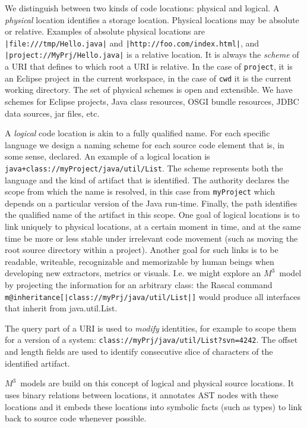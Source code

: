 \documentclass[a4]{IEEEtran}
\newcommand{\loc}[1]{\small{\texttt{#1}}}
\newcommand{\mthree}{\ensuremath{M^3}}
\begin{document}
We distinguish between two kinds of code locations: physical and logical. A \emph{physical} location identifies a storage location. Physical locations may be absolute or relative. Examples of absolute physical locations are \loc{|file:///tmp/Hello.java|} and \loc{|http://foo.com/index.html|}, and \loc{|project://MyPrj/Hello.java|} is a relative location. It is always the \emph{scheme} of a URI that defines to which root a URI is relative. In the case of \texttt{project}, it is an Eclipse project in the current workspace, in the case of \texttt{cwd} it is the current working directory. The set of physical schemes is open and extensible. We have schemes for Eclipse projects, Java class resources, OSGI bundle resources, JDBC data sources, jar files, etc.

A \emph{logical} code location is akin to a fully qualified name. For each specific language we design a naming scheme for each source code element that is, in some sense, declared. An example of a logical location is \loc{java+class://myProject/java/util/List}. The scheme represents both the language and the kind of artifact that is identified. The authority declares the scope from which the name is resolved, in this case from \texttt{myProject} which depends on a particular version of the Java run-time. Finally, the path identifies the qualified name of the artifact in this scope. One goal of logical locations is to link uniquely to physical locations, at a certain moment in time, and at the same time be more or less stable under irrelevant code movement (such as moving the root source directory within a project). Another goal for such links is to be readable, writeable, recognizable and memorizable by human beings when developing new extractors, metrics or visuals. I.e. we might explore an \mthree\ model by projecting the information for an arbitrary class: the Rascal command \texttt{m@inheritance[|class://myPrj/java/util/List|]} would produce all interfaces that inherit from java.util.List.

The query part of a URI is used to \emph{modify} identities, for example to scope them for a version of a system: \loc{class://myPrj/java/util/List?svn=4242}. The offset and length fields are used to identify consecutive slice of characters of the identified artifact.

\mthree\ models are build on this concept of logical and physical source locations. It uses binary relations between locations, it annotates AST nodes with these locations and it embeds these locations into symbolic facts (such as types) to link back to source code whenever possible.
\end{document}
